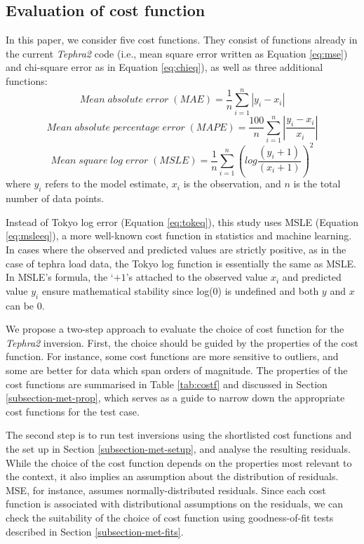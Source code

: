 \subsection{Evaluation of cost function}\label{subsection-met-eval}

In this paper, we consider five cost functions. They consist of functions already in the current \textit{Tephra2} code (i.e., mean square error written as Equation \ref{eq:mse}) and chi-square error as in Equation \ref{eq:chieq}), as well as three additional functions:
\begin{equation}
Mean\;absolute\;error\;(MAE) = \frac{1}{n} \sum_{i=1}^{n} |y_{i} - x_{i}|
\end{equation}
\begin{equation}
Mean\;absolute\;percentage\;error\;(MAPE) = \frac{100}{n} \sum_{i=1}^{n} \left | \frac{y_{i} - x_{i}}{x_{i}} \right|
\end{equation}
\begin{equation}
Mean\;square\;log\;error\;(MSLE) = \frac{1}{n} \sum_{i=1}^{n}\left (log \frac{(y_{i}+1) }{(x_{i}+1)}\right )^2 \label{eq:msleeq}
\end{equation} 
 where $y_{i}$ refers to the model estimate, $x_{i}$ is the observation, and $n$ is the total number of data points.

Instead of Tokyo log error (Equation \ref{eq:tokeq}), this study uses MSLE (Equation \ref{eq:msleeq}), a more well-known cost function in statistics and machine learning. In cases where the observed and predicted values are strictly positive, as in the case of tephra load data, the Tokyo log function is essentially the same as MSLE. In MSLE's formula, the `$+1$'s attached to the observed value $x_{i}$ and predicted value $y_{i}$ ensure mathematical stability since log(0) is undefined and both $y$ and $x$ can be 0. 

We propose a two-step approach to evaluate the choice of cost function for the \textit{Tephra2} inversion. First, the choice should be guided by the properties of the cost function. For instance, some cost functions are more sensitive to outliers, and some are better for data which span orders of magnitude. The properties of the cost functions are summarised in Table \ref{tab:costf} and discussed in Section \ref{subsection-met-prop}, which serves as a guide to narrow down the appropriate cost functions for the test case.

The second step is to run test inversions using the shortlisted cost functions and the set up in Section \ref{subsection-met-setup}, and analyse the resulting residuals. While the choice of the cost function depends on the properties most relevant to the context, it also implies an assumption about the distribution of residuals. MSE, for instance, assumes normally-distributed residuals. Since each cost function is associated with distributional assumptions on the residuals, we can check the suitability of the choice of cost function using goodness-of-fit tests described in Section \ref{subsection-met-fits}. 


